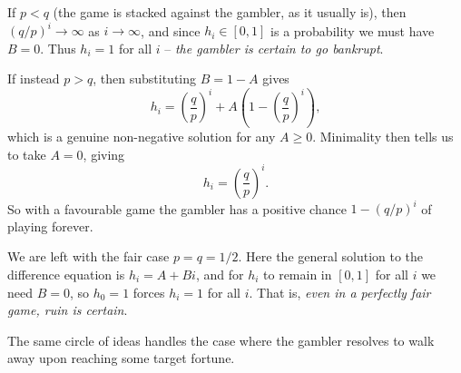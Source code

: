 If $p < q$ (the game is stacked against the gambler, as it usually is), then $(q/p)^i \rightarrow \infty$ as $i \rightarrow \infty$, and since $h_i \in [0, 1]$ is a probability we must have $B = 0$. Thus $h_i = 1$ for all $i$ -- \emph{the gambler is certain to go bankrupt}.

If instead $p > q$, then substituting $B = 1 - A$ gives
$$
h_i = \left(\frac{q}{p}\right)^i + A\left(1 - \left(\frac{q}{p}\right)^i\right),
$$
which is a genuine non-negative solution for any $A \geq 0$. Minimality then tells us to take $A = 0$, giving
$$
h_i = \left(\frac{q}{p}\right)^i.
$$
So with a favourable game the gambler has a positive chance $1 - (q/p)^i$ of playing forever.

We are left with the fair case $p = q = 1/2$. Here the general solution to the difference equation is $h_i = A + Bi$, and for $h_i$ to remain in $[0, 1]$ for all $i$ we need $B = 0$, so $h_0 = 1$ forces $h_i = 1$ for all $i$. That is, \emph{even in a perfectly fair game, ruin is certain}.

The same circle of ideas handles the case where the gambler resolves to walk away upon reaching some target fortune.

